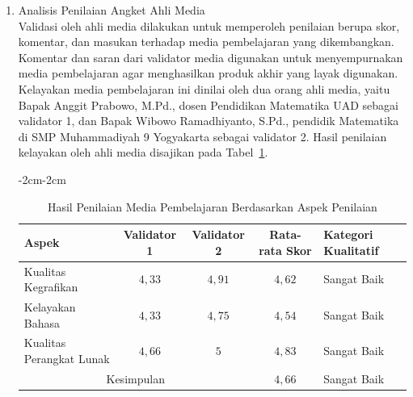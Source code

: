 \begin{enumerate}
    \item Analisis Penilaian Angket Ahli Media\\
    \hspace*{1cm}Validasi oleh ahli media dilakukan untuk memperoleh penilaian berupa skor, komentar, dan masukan terhadap media pembelajaran yang dikembangkan. Komentar dan saran dari validator media digunakan untuk menyempurnakan media pembelajaran agar menghasilkan produk akhir yang layak digunakan. Kelayakan media pembelajaran ini dinilai oleh dua orang ahli media, yaitu Bapak Anggit Prabowo, M.Pd., dosen Pendidikan Matematika UAD sebagai validator 1, dan Bapak Wibowo Ramadhiyanto, S.Pd., pendidik Matematika di SMP Muhammadiyah 9 Yogyakarta sebagai validator 2. Hasil penilaian kelayakan oleh ahli media disajikan pada Tabel~\ref{penilaianmedia}.
    \begin{table}[H]
        \begin{adjustwidth}{-2cm}{-2cm}
            \centering
            \caption{Hasil Penilaian Media Pembelajaran Berdasarkan Aspek Penilaian}
            \label{penilaianmedia}
            \begin{tabular}{|l|c|c|c|l|}
                \hline
                \textbf{Aspek} & \textbf{Validator 1} & \textbf{Validator 2} & \textbf{Rata-rata Skor} & \textbf{Kategori Kualitatif}\\
                \hline
                Kualitas Kegrafikan & \(4{,}33\) & \(4{,}91\) & \(4{,}62\) & Sangat Baik\\
                Kelayakan Bahasa & \(4{,}33\) & \(4{,}75\) & \(4{,}54\) & Sangat Baik\\
                Kualitas Perangkat Lunak & \(4{,}66\) & \(5\) & \(4{,}83\) & Sangat Baik\\
                \hline
                \multicolumn{3}{|c|}{Kesimpulan} & \(4{,}66\) & Sangat Baik\\
                \hline
            \end{tabular}
        \end{adjustwidth}
    \end{table}


\end{enumerate}
